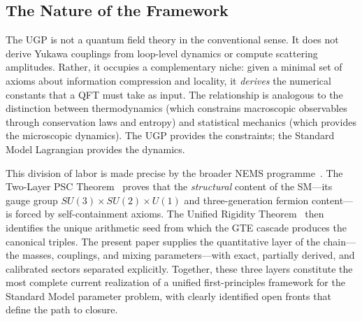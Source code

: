\documentclass[11pt]{article}
\theoremstyle{remark}
\begin{document}
\subsection{The Nature of the Framework}

The UGP is not a quantum field theory in the conventional sense.
It does not derive Yukawa couplings from loop-level dynamics or compute scattering amplitudes.
Rather, it occupies a complementary niche: given a minimal set of axioms about information compression and locality, it \emph{derives} the numerical constants that a QFT must take as input.
The relationship is analogous to the distinction between thermodynamics (which constrains macroscopic observables through conservation laws and entropy) and statistical mechanics (which provides the microscopic dynamics).
The UGP provides the constraints; the Standard Model Lagrangian provides the dynamics.

This division of labor is made precise by the broader NEMS programme~\cite{SpivackNEMSHub,SpivackNEMS88}.
The Two-Layer PSC Theorem~\cite{SpivackNEMS05} proves that the \emph{structural} content of the SM---its gauge group $SU(3) \times SU(2) \times U(1)$ and three-generation fermion content---is forced by self-containment axioms.
The Unified Rigidity Theorem~\cite{SpivackUnifiedRigidity} then identifies the unique arithmetic seed from which the GTE cascade produces the canonical triples.
The present paper supplies the quantitative layer of the chain---the masses, couplings, and mixing parameters---with exact, partially derived, and calibrated sectors separated explicitly.
Together, these three layers constitute the most complete current realization of a unified first-principles framework for the Standard Model parameter problem, with clearly identified open fronts that define the path to closure.
\end{document}

